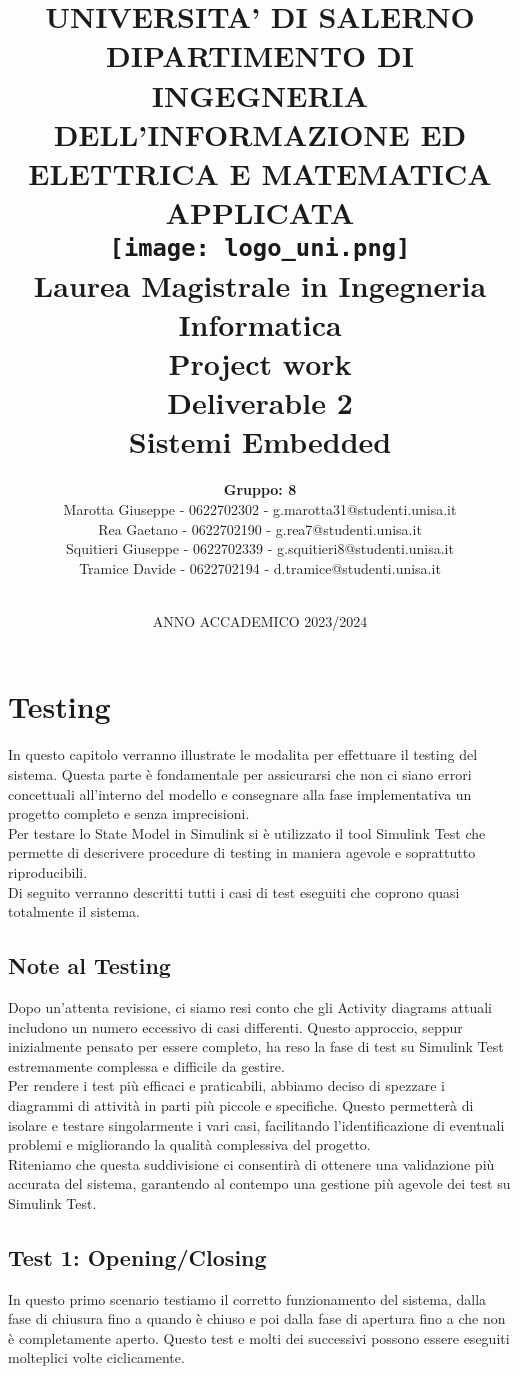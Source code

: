 \documentclass[12pt]{article}
\title{
    \Large \textbf{UNIVERSITA' DI SALERNO} \\[0.5em]
    \small DIPARTIMENTO DI INGEGNERIA DELL'INFORMAZIONE ED ELETTRICA E MATEMATICA APPLICATA\\[5em]
    \texttt{[image: logo\_uni.png]}\\[3em] %
    \normalsize Laurea Magistrale in Ingegneria Informatica \\[1em]
    \Large \textbf {Project work} \\[1em]
    \large \textbf {Deliverable 2} \\ [1em]
    \large {Sistemi Embedded} \\[1em]
}
\author{
    \textbf{Gruppo: 8} \\
    \normalsize Marotta Giuseppe - 0622702302 - g.marotta31@studenti.unisa.it\\
    \normalsize Rea Gaetano - 0622702190 - g.rea7@studenti.unisa.it\\
    \normalsize Squitieri Giuseppe - 0622702339 - g.squitieri8@studenti.unisa.it\\ 
    \normalsize Tramice Davide - 0622702194 - d.tramice@studenti.unisa.it\\ \\
    }
\date{
    ANNO ACCADEMICO 2023/2024 %
}
\begin{document}
\begin{titlingpage} %
\maketitle
\thispagestyle{empty} %
\end{titlingpage}

\newpage

\tableofcontents


\newpage

\section{Testing}

In questo capitolo verranno illustrate le modalita per effettuare il testing del sistema. Questa parte è fondamentale per assicurarsi che non ci siano errori concettuali all'interno del modello e consegnare alla fase implementativa un progetto completo e senza imprecisioni.\\
Per testare lo State Model in Simulink si è utilizzato il tool Simulink Test che permette di descrivere procedure di testing in maniera agevole e soprattutto riproducibili. \\
Di seguito verranno descritti tutti i casi di test eseguiti che coprono quasi totalmente il sistema.

\subsection{Note al Testing}
Dopo un'attenta revisione, ci siamo resi conto che gli Activity diagrams attuali includono un numero eccessivo di casi differenti. Questo approccio, seppur inizialmente pensato per essere completo, ha reso la fase di test su Simulink Test estremamente complessa e difficile da gestire.\\
Per rendere i test più efficaci e praticabili, abbiamo deciso di spezzare i diagrammi di attività in parti più piccole e specifiche. Questo permetterà di isolare e testare singolarmente i vari casi, facilitando l'identificazione di eventuali problemi e migliorando la qualità complessiva del progetto.\\
Riteniamo che questa suddivisione ci consentirà di ottenere una validazione più accurata del sistema, garantendo al contempo una gestione più agevole dei test su Simulink Test.

\subsection{Test 1: Opening/Closing}
In questo primo scenario testiamo il corretto funzionamento del sistema, dalla fase di chiusura fino a quando è chiuso e poi dalla fase di apertura fino a che non è completamente aperto. Questo test e molti dei successivi possono essere eseguiti molteplici volte ciclicamente.
\end{document}
